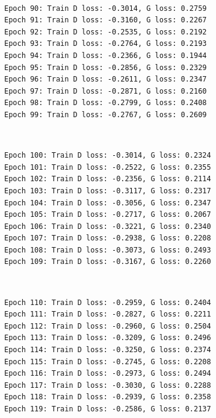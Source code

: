 \documentclass[11pt]{article}
\begin{document}
    \begin{center}
    \end{center}
    { \hspace*{\fill} \\}
    
    \begin{Verbatim}[commandchars=\\\{\}]
Epoch 90: Train D loss: -0.3014, G loss: 0.2759
Epoch 91: Train D loss: -0.3160, G loss: 0.2267
Epoch 92: Train D loss: -0.2535, G loss: 0.2192
Epoch 93: Train D loss: -0.2764, G loss: 0.2193
Epoch 94: Train D loss: -0.2366, G loss: 0.1944
Epoch 95: Train D loss: -0.2856, G loss: 0.2329
Epoch 96: Train D loss: -0.2611, G loss: 0.2347
Epoch 97: Train D loss: -0.2871, G loss: 0.2160
Epoch 98: Train D loss: -0.2799, G loss: 0.2408
Epoch 99: Train D loss: -0.2767, G loss: 0.2609

    \end{Verbatim}

    \begin{center}
    \end{center}
    { \hspace*{\fill} \\}
    
    \begin{Verbatim}[commandchars=\\\{\}]
Epoch 100: Train D loss: -0.3014, G loss: 0.2324
Epoch 101: Train D loss: -0.2522, G loss: 0.2355
Epoch 102: Train D loss: -0.2356, G loss: 0.2114
Epoch 103: Train D loss: -0.3117, G loss: 0.2317
Epoch 104: Train D loss: -0.3056, G loss: 0.2347
Epoch 105: Train D loss: -0.2717, G loss: 0.2067
Epoch 106: Train D loss: -0.3221, G loss: 0.2340
Epoch 107: Train D loss: -0.2938, G loss: 0.2208
Epoch 108: Train D loss: -0.3073, G loss: 0.2493
Epoch 109: Train D loss: -0.3167, G loss: 0.2260

    \end{Verbatim}

    \begin{center}
    \end{center}
    { \hspace*{\fill} \\}
    
    \begin{Verbatim}[commandchars=\\\{\}]
Epoch 110: Train D loss: -0.2959, G loss: 0.2404
Epoch 111: Train D loss: -0.2827, G loss: 0.2211
Epoch 112: Train D loss: -0.2960, G loss: 0.2504
Epoch 113: Train D loss: -0.3209, G loss: 0.2496
Epoch 114: Train D loss: -0.3250, G loss: 0.2374
Epoch 115: Train D loss: -0.2745, G loss: 0.2208
Epoch 116: Train D loss: -0.2973, G loss: 0.2494
Epoch 117: Train D loss: -0.3030, G loss: 0.2288
Epoch 118: Train D loss: -0.2939, G loss: 0.2358
Epoch 119: Train D loss: -0.2586, G loss: 0.2137

    \end{Verbatim}
\end{document}
